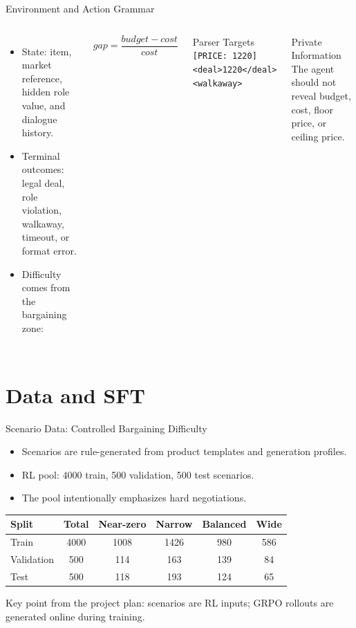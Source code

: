 \documentclass{beamer}
\begin{document}
\begin{frame}{Environment and Action Grammar}
\begin{columns}
\begin{itemize}
    \item State: item, market reference, hidden role value, and dialogue history.
    \item Terminal outcomes: legal deal, role violation, walkaway, timeout, or format error.
    \item Difficulty comes from the bargaining zone:
\end{itemize}
\[
gap = \frac{budget - cost}{cost}
\]
\begin{block}{Parser Targets}
\small
\texttt{[PRICE: 1220]}\\
\texttt{<deal>1220</deal>}\\
\texttt{<walkaway>}
\end{block}
\begin{block}{Private Information}
\small
The agent should not reveal budget, cost, floor price, or ceiling price.
\end{block}
\end{columns}
\end{frame}

\section{Data and SFT}

\begin{frame}{Scenario Data: Controlled Bargaining Difficulty}
\begin{itemize}
    \item Scenarios are rule-generated from product templates and generation profiles.
    \item RL pool: 4000 train, 500 validation, 500 test scenarios.
    \item The pool intentionally emphasizes hard negotiations.
\end{itemize}
\vspace{0.2cm}
\begin{table}
\centering
\small
\begin{tabular}{@{}lccccc@{}}
\toprule
Split & Total & Near-zero & Narrow & Balanced & Wide\\
\midrule
Train & 4000 & 1008 & 1426 & 980 & 586\\
Validation & 500 & 114 & 163 & 139 & 84\\
Test & 500 & 118 & 193 & 124 & 65\\
\bottomrule
\end{tabular}
\end{table}
\vspace{0.1cm}
\small
Key point from the project plan: scenarios are RL inputs; GRPO rollouts are
generated online during training.
\end{frame}
\end{document}
